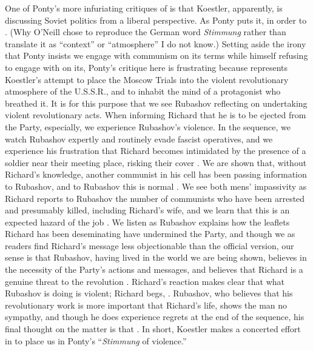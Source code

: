 One of Ponty's more infuriating critiques of \dark{} is that Koestler, apparently, is
discussing Soviet politics from a liberal perspective. As Ponty puts it, in order to
. (Why O'Neill chose to reproduce the German word
\textit{Stimmung} rather than translate it as \enquote{context} or \enquote{atmosphere} I
do not know.) Setting aside the irony that Ponty insists we engage with communism on its
terms while himself refusing to engage with \dark{} on its, Ponty's critique here is
frustrating because \dark{} represents Koestler's attempt to place the Moscow Trials into
the violent revolutionary atmosphere of the U.S.S.R., and to inhabit the mind of a
protagonist who breathed it. It is for this purpose that we see Rubashov reflecting on
undertaking violent revolutionary acts. When informing Richard that he is to be ejected
from the Party, especially, we experience Rubashov's violence. In the sequence, we watch
Rubashov expertly and routinely evade fascist operatives, and we experience his
frustration that Richard becomes intimidated by the presence of a soldier near their
meeting place, risking their cover \parencite[13]{koestler}. We are shown that, without
Richard's knowledge, another communist in his cell has been passing information to
Rubashov, and to Rubashov this is normal \parencite[13]{koestler}. We see both mens'
impassivity as Richard reports to Rubashov the number of communists who have been arrested
and presumably killed, including Richard's wife, and we learn that this is an expected
hazard of the job \parencite[13]{koestler}. We listen as Rubashov explains how the
leaflets Richard has been deseminating have undermined the Party, and though we as readers
find Richard's message less objectionable than the official version, our sense is that
Rubashov, having lived in the world we are being shown, believes in the necessity of the
Party's actions and messages, and believes that Richard is a genuine threat to the
revolution \parencite[14]{koestler}. Richard's reaction makes clear that what Rubashov is
doing is violent; Richard begs, . Rubashov, who believes that his revolutionary work is more
important that Richard's life, shows the man no sympathy, and though he does experience
regrets at the end of the sequence, his final thought on the matter is that
. In short,
Koestler makes a concerted effort in \dark{} to place us in Ponty's
\enquote{\textit{Stimmung} of violence.}

